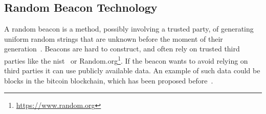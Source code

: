 \subsection{Random Beacon Technology}
A random beacon is a method, possibly involving a trusted party, of generating uniform random strings that are unknown before the moment of their generation~\cite{andrychowicz2014distributed}.
Beacons are hard to construct, and often rely on trusted third parties like the \acrfull{nist}~\cite{nistbeacon} or Random.org\footnote{\url{https://www.random.org}}.
If the beacon wants to avoid relying on third parties it can use publicly available data.
An example of such data could be blocks in the bitcoin blockchain, which has been proposed before~\cite{bonneau2015bitcoin}.
